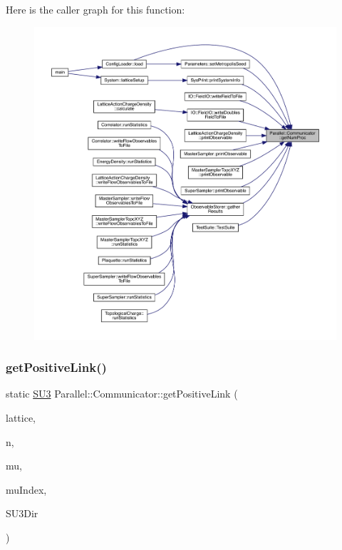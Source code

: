 Here is the caller graph for this function\+:\nopagebreak
\begin{figure}[H]
\begin{center}
\leavevmode
\includegraphics[width=350pt]{class_parallel_1_1_communicator_a7b1f80fb49a0cc83f2031c3415174150_icgraph}
\end{center}
\end{figure}
\mbox{\label{class_parallel_1_1_communicator_aa716fcde544018dcc5967df9b6708bb5}} 
\subsubsection{\texorpdfstring{getPositiveLink()}{getPositiveLink()}}
{\footnotesize\ttfamily static \mbox{\hyperlink{class_s_u3}{S\+U3}} Parallel\+::\+Communicator\+::get\+Positive\+Link (\begin{DoxyParamCaption}\item[{\mbox{\hyperlink{class_lattice}{Lattice}}$<$ \mbox{\hyperlink{class_s_u3}{S\+U3}} $>$ $\ast$}]{lattice,  }\item[{std\+::vector$<$ int $>$}]{n,  }\item[{int}]{mu,  }\item[{int $\ast$}]{mu\+Index,  }\item[{int}]{S\+U3\+Dir }\end{DoxyParamCaption})\hspace{0.3cm}{\ttfamily [static]}}

